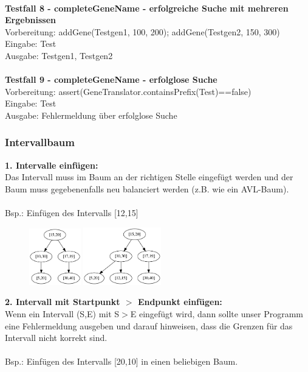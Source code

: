 \\
\textbf{Testfall 8 - completeGeneName - erfolgreiche Suche mit mehreren Ergebnissen}\\
Vorbereitung: addGene(Testgen1, 100, 200); addGene(Testgen2, 150, 300)\\
Eingabe: Test\\
Ausgabe: Testgen1, Testgen2\\
\\
\textbf{Testfall 9 - completeGeneName - erfolglose Suche}\\
Vorbereitung: assert(GeneTranslator.containsPrefix(Test)==false)\\
Eingabe: Test\\
Ausgabe: Fehlermeldung über erfolglose Suche
\subsubsection{Intervallbaum}
\textbf{1. Intervalle einfügen:}\\
Das Intervall muss im Baum an der richtigen Stelle eingefügt werden und der Baum muss gegebenenfalls neu balanciert werden (z.B. wie ein AVL-Baum).\\\\
Bsp.: Einfügen des Intervalls [12,15]
\begin{figure}[H]
 \centering
	\includegraphics[width=0.2\textwidth]{middleware/Testfaelle/1.png}
	\includegraphics[width=0.3\textwidth]{middleware/Testfaelle/2.png}
\end{figure}
\textbf{2. Intervall mit Startpunkt $>$ Endpunkt einfügen:}\\
Wenn ein Intervall (S,E) mit S$>$E eingefügt wird, dann sollte unser Programm eine Fehlermeldung ausgeben und darauf hinweisen, dass die Grenzen für das Intervall nicht korrekt sind.\\\\
Bsp.: Einfügen des Intervalls [20,10] in einen beliebigen Baum.\\\\

